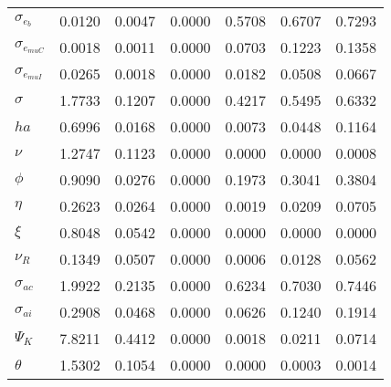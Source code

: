 \begin{center}
\begin{longtable}{lcccccc}
$ \sigma_{{e_b}}       $	 & 	          0.0120	 & 	          0.0047	 & 	          0.0000	 & 	          0.5708	 & 	          0.6707	 & 	          0.7293 \\ 
$ \sigma_{{e_{muC}}}   $	 & 	          0.0018	 & 	          0.0011	 & 	          0.0000	 & 	          0.0703	 & 	          0.1223	 & 	          0.1358 \\ 
$ \sigma_{{e_{muI}}}   $	 & 	          0.0265	 & 	          0.0018	 & 	          0.0000	 & 	          0.0182	 & 	          0.0508	 & 	          0.0667 \\ 
$ {\sigma}             $	 & 	          1.7733	 & 	          0.1207	 & 	          0.0000	 & 	          0.4217	 & 	          0.5495	 & 	          0.6332 \\ 
$ {ha}                 $	 & 	          0.6996	 & 	          0.0168	 & 	          0.0000	 & 	          0.0073	 & 	          0.0448	 & 	          0.1164 \\ 
$ \nu                  $	 & 	          1.2747	 & 	          0.1123	 & 	          0.0000	 & 	          0.0000	 & 	          0.0000	 & 	          0.0008 \\ 
$ {\phi}               $	 & 	          0.9090	 & 	          0.0276	 & 	          0.0000	 & 	          0.1973	 & 	          0.3041	 & 	          0.3804 \\ 
$ {\eta}               $	 & 	          0.2623	 & 	          0.0264	 & 	          0.0000	 & 	          0.0019	 & 	          0.0209	 & 	          0.0705 \\ 
$ \xi                  $	 & 	          0.8048	 & 	          0.0542	 & 	          0.0000	 & 	          0.0000	 & 	          0.0000	 & 	          0.0000 \\ 
$ {\nu_R}              $	 & 	          0.1349	 & 	          0.0507	 & 	          0.0000	 & 	          0.0006	 & 	          0.0128	 & 	          0.0562 \\ 
$ {\sigma_{ac}}        $	 & 	          1.9922	 & 	          0.2135	 & 	          0.0000	 & 	          0.6234	 & 	          0.7030	 & 	          0.7446 \\ 
$ {\sigma_{ai}}        $	 & 	          0.2908	 & 	          0.0468	 & 	          0.0000	 & 	          0.0626	 & 	          0.1240	 & 	          0.1914 \\ 
$ {\Psi_{K}}           $	 & 	          7.8211	 & 	          0.4412	 & 	          0.0000	 & 	          0.0018	 & 	          0.0211	 & 	          0.0714 \\ 
$ {\theta}             $	 & 	          1.5302	 & 	          0.1054	 & 	          0.0000	 & 	          0.0000	 & 	          0.0003	 & 	          0.0014 \\ 

\end{longtable}
\end{center}
